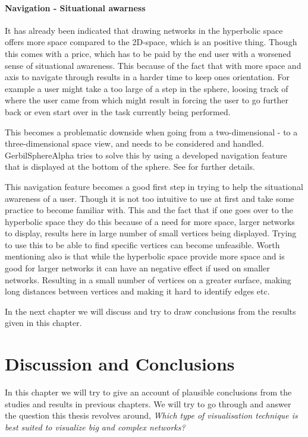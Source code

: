 \documentclass[a4paper,11pt]{kth-mag}
\begin{document}
\subsubsection{Navigation - Situational awarness}
It has already been indicated that drawing networks in the hyperbolic space offers more space compared to the
2D-space, which is an positive thing. Though this comes with a price, which has to be paid by the end user with a
 worsened sense of situational awareness. This because of the fact that with more space
and axis to navigate through results in a harder time to keep ones orientation. For example a user might take a too large of 
a step in the sphere, loosing track of where the user came from which might result in forcing the user to go further back
or even start over in the task currently being performed.

This becomes a problematic downside when going from a two-dimensional - to a three-dimensional space view, and needs to be considered and handled. 
GerbilSphereAlpha tries to solve this by using a developed navigation feature that is displayed at the
bottom of the sphere. See \cite{Shelley20121016} for further details. 

This navigation feature becomes a good first step in trying to help the situational awareness of a user. Though it is not too intuitive to use at
first and take some practice to become familiar with. This and the fact that if one goes over to the 
hyperbolic space they do this because of a need for more space, larger networks to display, results here in large number of
small vertices being displayed. Trying to use this to be able to find specific vertices can become unfeasible. Worth 
mentioning also is that while the hyperbolic space provide more space and is good for larger networks it can 
have an negative effect if used on smaller networks. Resulting in a small number of vertices on a greater surface, making long distances between vertices and making it hard to identify
 edges etc.

In the next chapter we will discuss and try to draw conclusions from the results given in this chapter.
\chapter{Discussion and Conclusions}
\label{chapter:five}
In this chapter we will try to give an account of plausible conclusions from the studies and results in previous chapters. We will try to go through and answer the question this thesis 
revolves around, \emph{Which type of visualisation technique is best suited to visualize big and complex networks?}\\
\end{document}
